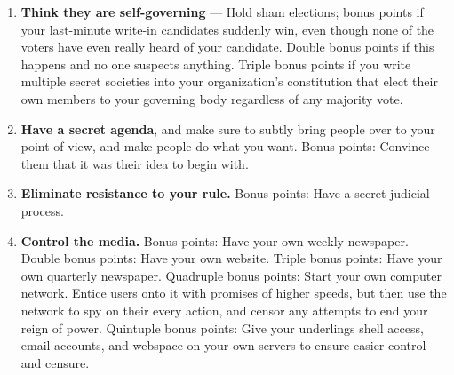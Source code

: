 \documentclass[9pt]{extarticle}
\begin{document}
\begin{minipage}[t]{.61\linewidth}
\begin{enumerate}
\item \textbf{Think they are self-governing} — Hold sham elections; 
bonus points if your last-minute write-in candidates suddenly win, 
even though none of the voters have even really heard of your candidate. 
Double bonus points if this happens and no one suspects anything. 
Triple bonus points if you write multiple secret societies into your
organization's constitution that elect their own members to your governing
body regardless of any majority vote.

\item \textbf{Have a secret agenda}, and make sure to subtly bring people 
over to your point of view, and make people do what you want. Bonus points: 
Convince them that it was their idea to begin with.

\item \textbf{Eliminate resistance to your rule.} Bonus points: Have a 
secret judicial process.

\item \textbf{Control the media.} Bonus points: Have your own weekly newspaper. 
Double bonus points: Have your own website. Triple bonus points: Have your 
own quarterly newspaper. Quadruple bonus points: Start your own computer 
network. Entice users onto it with promises of higher speeds, but then use 
the network to spy on their every action, and censor any attempts to end 
your reign of power. Quintuple bonus points: Give your underlings shell 
access, email accounts, and webspace on your own servers to ensure easier
control and censure.
\end{enumerate}

\end{minipage} %
\end{document}
